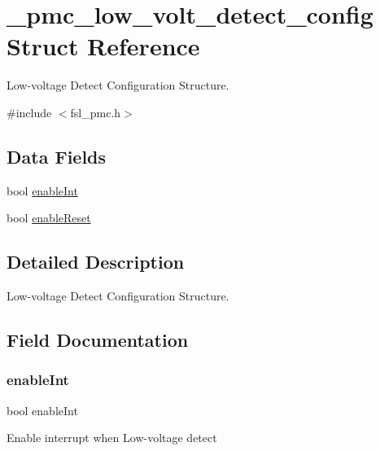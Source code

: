 \hypertarget{struct__pmc__low__volt__detect__config}{}\section{\+\_\+pmc\+\_\+low\+\_\+volt\+\_\+detect\+\_\+config Struct Reference}
\label{struct__pmc__low__volt__detect__config}


Low-\/voltage Detect Configuration Structure.  




{\ttfamily \#include $<$fsl\+\_\+pmc.\+h$>$}

\subsection*{Data Fields}
\begin{DoxyCompactItemize}
\item 
bool \mbox{\hyperlink{struct__pmc__low__volt__detect__config_a7524eb6241d1b2490fce40576fa213f1}{enable\+Int}}
\item 
bool \mbox{\hyperlink{struct__pmc__low__volt__detect__config_ac0678f5b9d03b98f0825115ebf8a4a8c}{enable\+Reset}}
\end{DoxyCompactItemize}


\subsection{Detailed Description}
Low-\/voltage Detect Configuration Structure. 

\subsection{Field Documentation}
\mbox{\label{struct__pmc__low__volt__detect__config_a7524eb6241d1b2490fce40576fa213f1}} 
\subsubsection{\texorpdfstring{enableInt}{enableInt}}
{\footnotesize\ttfamily bool enable\+Int}

Enable interrupt when Low-\/voltage detect \mbox{\label{struct__pmc__low__volt__detect__config_ac0678f5b9d03b98f0825115ebf8a4a8c}} 
